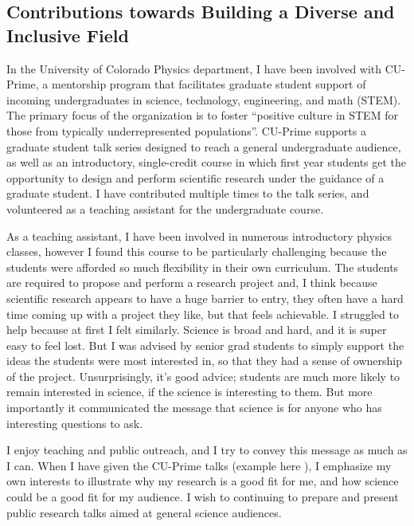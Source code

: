 \documentclass{article}
\author{}
\date{}
\begin{document}
\subsection*{Contributions towards Building a Diverse and Inclusive Field}
In the University of Colorado Physics department, I have been involved with CU-Prime, a mentorship program that facilitates graduate student support of incoming undergraduates in science, technology, engineering, and math (STEM). 
The primary focus of the organization is to foster ``positive culture in STEM for those from typically underrepresented populations''\cite{cup}.
CU-Prime supports a graduate student talk series designed to reach a general undergraduate audience, as well as an introductory, single-credit course in which first year students get the opportunity to design and perform scientific research under the guidance of a graduate student. 
I have contributed multiple times to the talk series, and volunteered as a teaching assistant for the undergraduate course. 

As a teaching assistant, I have been involved in numerous introductory physics classes, however I found this course to be particularly challenging because the students were afforded so much flexibility in their own curriculum.
The students are required to propose and perform a research project and, I think because scientific research appears to have a huge barrier to entry, they often have a hard time coming up with a project they like, but that feels achievable. 
I struggled to help because at first I felt similarly. Science is broad and hard, and it is super easy to feel lost.
But I was advised by senior grad students to simply support the ideas the students were most interested in, so that they had a sense of ownership of the project.
Unsurprisingly, it's good advice; students are much more likely to remain interested in science, if the science is interesting to them. 
But more importantly it communicated the message that science is for anyone who has interesting questions to ask.

I enjoy teaching and public outreach, and I try to convey this message as much as I can.
When I have given the CU-Prime talks (example here \cite{jJ22}), I emphasize my own interests to illustrate why my research is a good fit for me, and how science could be a good fit for my audience. I wish to continuing to prepare and present public research talks aimed at general science audiences.
\end{document}

